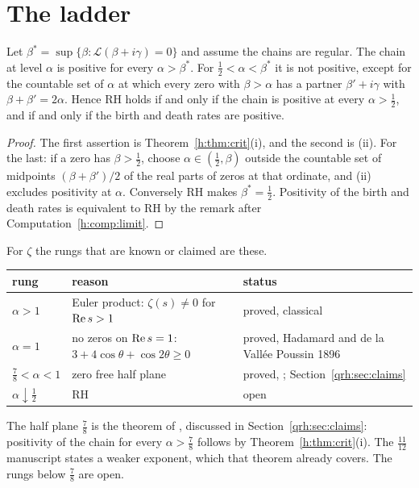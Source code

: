 \section{The ladder}

\begin{corollary}[Threshold]\label{h:cor:ladder}
Let $\beta^*=\sup\{\beta:\mathcal L(\beta+i\gamma)=0\}$ and assume the chains are regular. The chain at level $\alpha$ is positive for every $\alpha>\beta^*$. For $\frac12<\alpha<\beta^*$ it is not positive, except for the countable set of $\alpha$ at which every zero with $\beta>\alpha$ has a partner $\beta'+i\gamma$ with $\beta+\beta'=2\alpha$. Hence RH holds if and only if the chain is positive at every $\alpha>\frac12$, and if and only if the birth and death rates are positive.
\end{corollary}

\begin{proof}
The first assertion is Theorem~\ref{h:thm:crit}(i), and the second is (ii). For the last: if a zero has $\beta>\frac12$, choose $\alpha\in(\frac12,\beta)$ outside the countable set of midpoints $(\beta+\beta')/2$ of the real parts of zeros at that ordinate, and (ii) excludes positivity at $\alpha$. Conversely RH makes $\beta^*=\frac12$. Positivity of the birth and death rates is equivalent to RH by the remark after Computation~\ref{h:comp:limit}.
\end{proof}

For $\zeta$ the rungs that are known or claimed are these.
\begin{center}\small
\begin{tabular}{@{}p{}p{}p{}@{}}
\toprule
rung & reason & status\\
\midrule
$\alpha>1$ & Euler product: $\zeta(s)\ne0$ for $\operatorname{Re} s>1$ & proved, classical\\
$\alpha=1$ & no zeros on $\operatorname{Re} s=1$: $3+4\cos\theta+\cos2\theta\ge0$ & proved, Hadamard and de la Vall\'ee Poussin 1896\\
$\frac78<\alpha<1$ & zero free half plane & proved, \cite{OAI26a}; Section~\ref{qrh:sec:claims}\\
$\alpha\downarrow\frac12$ & RH & open\\
\bottomrule
\end{tabular}
\end{center}
The half plane $\frac78$ is the theorem of \cite{OAI26a}, discussed in Section~\ref{qrh:sec:claims}: positivity of the chain for every $\alpha>\frac78$ follows by Theorem~\ref{h:thm:crit}(i). The $\frac{11}{12}$ manuscript \cite{OAI26b} states a weaker exponent, which that theorem already covers. The rungs below $\frac78$ are open.

